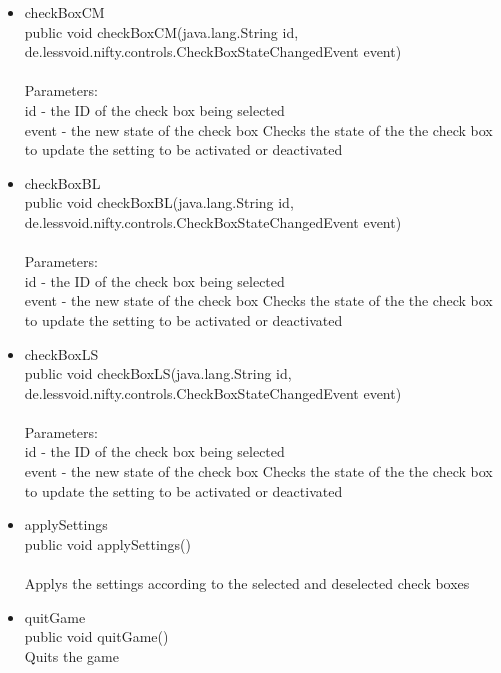 \documentclass[letterpaper]{article}
\begin{document}
\begin{itemize}
\begin{itemize}
													\item	checkBoxCM \\
															public void checkBoxCM(java.lang.String id, \\
						              de.lessvoid.nifty.controls.CheckBoxStateChangedEvent event) \\ \\
															Parameters: \\
															id - the ID of the check box being selected \\
															event - the new state of the check box Checks the state of the the check box to update the setting to be activated or deactivated
													\item	checkBoxBL \\
															public void checkBoxBL(java.lang.String id, \\
						              de.lessvoid.nifty.controls.CheckBoxStateChangedEvent event) \\ \\
															Parameters: \\
															id - the ID of the check box being selected \\
															event - the new state of the check box Checks the state of the the check box to update the setting to be activated or deactivated
													\item	checkBoxLS \\
															public void checkBoxLS(java.lang.String id, \\
						              de.lessvoid.nifty.controls.CheckBoxStateChangedEvent event) \\ \\
															Parameters: \\
															id - the ID of the check box being selected \\
															event - the new state of the check box Checks the state of the the check box to update the setting to be activated or deactivated
													\item	applySettings \\
															public void applySettings() \\ \\
															Applys the settings according to the selected and deselected check boxes
													\item	quitGame \\
															public void quitGame() \\
															Quits the game
												\end{itemize}
									\end{itemize}
\end{document}
